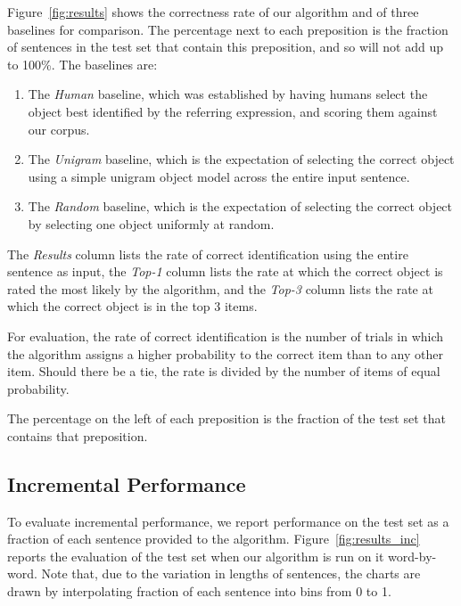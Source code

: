 \documentclass[letterpaper,10pt]{article}
\begin{document}
Figure~\ref{fig:results} shows the correctness rate of our algorithm and of three baselines for comparison. The percentage next to each preposition is the fraction of sentences in the test set that contain this preposition, and so will not add up to 100\%. The baselines are:
\begin{enumerate}[topsep=0pt,itemsep=-1ex,partopsep=1ex,parsep=1ex]
	\item The \emph{Human} baseline, which was established by having humans select the object best identified by the referring expression, and scoring them against our corpus.
	\item The \emph{Unigram} baseline, which is the expectation of selecting the correct object using a simple unigram object model across the entire input sentence.
	\item The \emph{Random} baseline, which is the expectation of selecting the correct object by selecting one object uniformly at random.
\end{enumerate}

The \emph{Results} column lists the rate of correct identification using the entire sentence as input, the \emph{Top-1} column lists the rate at which the correct object is rated the most likely by the algorithm, and the \emph{Top-3} column lists the rate at which the correct object is in the top 3 items.

For evaluation, the rate of correct identification is the number of trials in which the algorithm assigns a higher probability to the correct item than to any other item. Should there be a tie, the rate is divided by the number of items of equal probability.

The percentage on the left of each preposition is the fraction of the test set that contains that preposition.

\subsection{Incremental Performance}

To evaluate incremental performance, we report performance on the test set as a fraction of each sentence provided to the algorithm. Figure~\ref{fig:results_inc} reports the evaluation of the test set when our algorithm is run on it word-by-word. Note that, due to the variation in lengths of sentences, the charts are drawn by interpolating fraction of each sentence into bins from 0 to 1.
\end{document}
